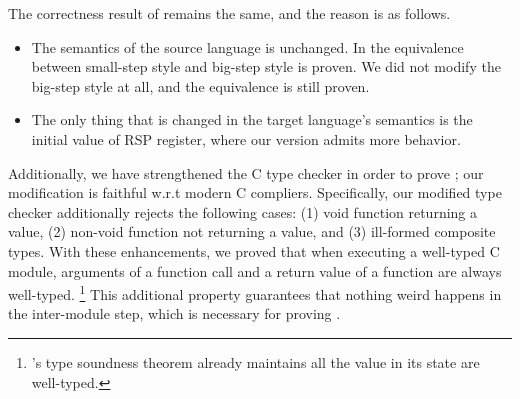 The correctness result of \cc{} remains the same, and the reason is as follows.
\begin{itemize}
\item The semantics of the source language is unchanged. In  the equivalence between small-step style and big-step style is proven.
  We did not modify the big-step style at all, and the equivalence is still proven.
\item The only thing that is changed in the target language's semantics is the initial value of RSP register, where our version admits more behavior. 
\end{itemize}

Additionally, we have strengthened the C type checker in order to prove ; our modification is faithful w.r.t modern C compliers.%
Specifically, our modified type checker additionally rejects the following cases: (1) void function returning a value, (2) non-void function not returning a value, and (3) ill-formed composite types.
With these enhancements, we proved that when executing a well-typed C module, arguments of a function call and a return value of a function are always well-typed.
\footnote{\cc{}'s type soundness theorem already maintains all the value in its state are well-typed.}
This additional property guarantees that nothing weird happens in the inter-module step, which is necessary for proving .








